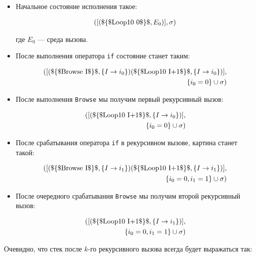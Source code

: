 \begin{itemize}
\item{Начальное состояние исполнения такое:

  \begin{eqnarray*}
( [(\text{\lstinline|$\{$Loop10 0$\}$|}, E_0)], \sigma)
    \end{eqnarray*}

где $E_0$ --- среда вызова.}

\item{После выполнения оператора \lstinline|if| состояние станет таким:

  \begin{eqnarray*}
( [(\text{\lstinline|$\{$Browse I$\}$|}, \{I \to i_0 \}) (\text{\lstinline|$\{$Loop10 I+1$\}$|} , \{I \to i_0 \})], \\
\{i_0 = 0\} \cup \sigma  )
  \end{eqnarray*}
}

  \item{После выполнения \lstinline|Browse| мы получим первый рекурсивный вызов:

    \begin{eqnarray*}
( [(\text{\lstinline|$\{$Loop10 I+1$\}$|}, \{I \to i_0 \})], \\
      \{i_0 = 0\} \cup \sigma  )
      \end{eqnarray*}
    }

\item{После срабатывания оператора \lstinline|if| в рекурсивном вызове, картина станет такой:

  \begin{eqnarray*}
( [(\text{\lstinline|$\{$Browse I$\}$|}, \{I \to i_1 \}) (\text{\lstinline|$\{$Loop10 I+1$\}$|}, \{I \to i_1 \})], \\
    \{i_0 = 0, i_1 = 1\} \cup \sigma  )
    \end{eqnarray*}
  }

\item{После очередного срабатывания \lstinline|Browse| мы получим второй рекурсивный вызов:

  \begin{eqnarray*}
( [(\text{\lstinline|$\{$Loop10 I+1$\}$|}, \{I \to i_1 \})], \\
    \{i_0 = 0, i_1 = 1\} \cup \sigma  )
    \end{eqnarray*}
  }
\end{itemize}

Очевидно, что стек после $k$-го рекурсивного вызова всегда будет выражаться так:


